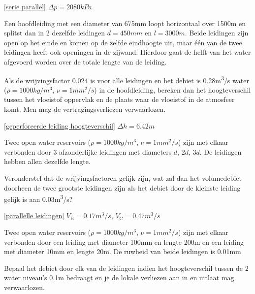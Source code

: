 \begin{antwoord}{\ref{serie parallel}}
	$\Delta p = 2080\unit{kPa}$
\end{antwoord}
\begin{toepassing}
	\label{geperforeerde leiding hoogteverschil}
Een hoofdleiding met een diameter van 675\unit{mm} loopt horizontaal over 1500\unit{m} en splitst dan in 2 dezelfde leidingen $d=450\unit{mm}$ en $l=3000\unit{m}$. Beide leidingen zijn open op het einde en komen op de zelfde eindhoogte uit, maar één van de twee leidingen heeft ook openingen in de zijwand. Hierdoor gaat de helft van het water afgevoerd worden over de totale lengte van de leiding.

Als de wrijvingsfactor 0.024 is voor alle leidingen en het debiet is 0.28\unit{m^3/s} water ($\rho=1000\unit{kg/m^3}$, $\nu=1\unit{mm^2/s}$) in de hoofdleiding, bereken dan het hoogteverschil tussen het vloeistof oppervlak en de plaats waar de vloeistof in de atmosfeer komt. Men mag de vertragingsverliezen verwaarlozen.
\end{toepassing}
\begin{antwoord}{\ref{geperforeerde leiding hoogteverschil}}
	$\Delta h = 6.42\unit{m}$
\end{antwoord}
\begin{toepassing}
	\label{parallelle leidingen}
Twee open water reservoirs ($\rho=1000\unit{kg/m^3}$, $\nu=1\unit{mm^2/s}$) zijn met elkaar verbonden door 3 afzonderlijke leidingen met diameters $d$, $2d$, $3d$. De leidingen hebben allen dezelfde lengte.
		
Veronderstel dat de wrijvingsfactoren gelijk zijn, wat zal dan het volumedebiet doorheen de twee grootste leidingen zijn als het debiet door de kleinste leiding gelijk is aan 0.03\unit{m^3/s}? 
\end{toepassing}
\begin{antwoord}{\ref{parallelle leidingen}}
	$\dot{V}_\mathrm{B} = 0.17\unit{m^3/s}$, $\dot{V}_\mathrm{C} = 0.47\unit{m^3/s}$
\end{antwoord}
\begin{toepassing}[*]
	\label{turbulent laminair}
	Twee open water reservoirs ($\rho=1000\unit{kg/m^3}$, $\nu=1\unit{mm^2/s}$) zijn met elkaar verbonden door een leiding met diameter 100\unit{mm} en lengte 200\unit{m} en een leiding met diameter 10\unit{mm} en lengte 20\unit{m}. De ruwheid van beide leidingen is 0.01\unit{mm}
	
Bepaal het debiet door elk van de leidingen indien het hoogteverschil tussen de 2 water niveau's 0.1\unit{m} bedraagt en je de lokale verliezen aan in en uitlaat mag verwaarlozen.
\end{toepassing}

